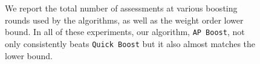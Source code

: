 \begin{figure}[ht]
\begin{subfigure}{.31\linewidth}
\end{subfigure}
\caption{We report the total number of assessments at various boosting rounds used by the algorithms, as well as the weight order lower bound. In all of these experiments, our algorithm, \texttt{AP Boost}, not only consistently beats \texttt{Quick Boost} but it also almost matches the lower bound.}
\label{fig:wolb}
\end{figure}